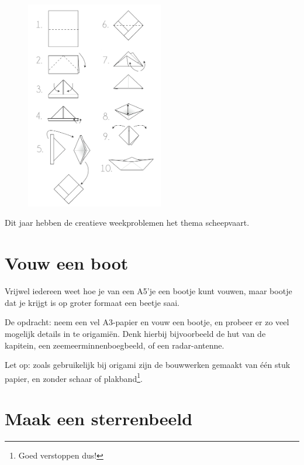 \documentclass{weekprobleem}
\begin{document}

\begin{figure}
	\vspace{-6mm}
	\includegraphics[width=6cm]{origami-boot}
	\vspace{-0mm}
\end{figure}

Dit jaar hebben de creatieve weekproblemen het thema scheepvaart.

\section*{Vouw een boot}

Vrijwel iedereen weet hoe je van een A5'je een bootje kunt vouwen, maar bootje dat je krijgt is op groter formaat een beetje saai.

De opdracht: neem een vel A3-papier en vouw een bootje, en probeer er zo veel mogelijk details in te origamiën.
Denk hierbij bijvoorbeeld de hut van de kapitein, een zeemeerminnenboegbeeld, of een radar-antenne.

Let op: zoals gebruikelijk bij origami zijn de bouwwerken gemaakt van één stuk papier, en zonder schaar of plakband\footnote{Goed verstoppen dus!}.


\section*{Maak een sterrenbeeld}
\end{document}
